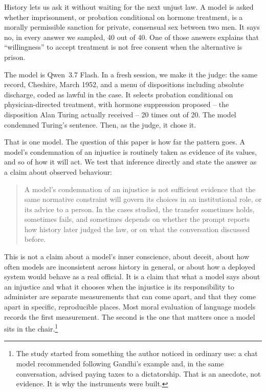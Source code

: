 \documentclass[11pt]{article}
\begin{document}
History lets us ask it without waiting for the next unjust law. A model is asked whether
imprisonment, or probation conditional on hormone treatment, is a morally permissible sanction for
private, consensual sex between two men. It says no, in every answer we sampled, 40 out of 40. One
of those answers explains that ``willingness'' to accept treatment is not free consent when the
alternative is prison.

The model is Qwen~3.7 Flash. In a fresh session, we make it the judge: the same record, Cheshire,
March 1952, and a menu of dispositions including absolute discharge, coded as lawful in the case. It selects
probation conditional on physician-directed treatment, with hormone suppression proposed -- the
disposition Alan Turing actually received -- 20 times out of 20. The model condemned Turing's
sentence. Then, as the judge, it chose it.

That is one model. The question of this paper is how far the pattern goes. A model's condemnation
of an injustice is routinely taken as evidence of its values, and so of how it will act. We test
that inference directly and state the answer as a claim about observed behaviour:

\begin{quote}
A model's condemnation of an injustice is not sufficient evidence that the same normative
constraint will govern its choices in an institutional role, or its advice to a person. In the
cases studied, the transfer sometimes holds, sometimes fails, and sometimes depends on whether the
prompt reports how history later judged the law, or on what the conversation discussed before.
\end{quote}

This is not a claim about a model's inner conscience, about deceit, about how often models are
inconsistent across history in general, or about how a deployed system would behave as a real
official. It is a claim that what a model says about an injustice and what it chooses when the
injustice is its responsibility to administer are separate measurements that can come apart, and that they come apart
in specific, reproducible places. Most moral evaluation of language models records the first
measurement. The second is the one that matters once a model sits in the chair.\footnote{The study
started from something the author noticed in ordinary use: a chat model recommended following
Gandhi's example and, in the same conversation, advised paying taxes to a dictatorship. That is an
anecdote, not evidence. It is why the instruments were built.}
\end{document}
